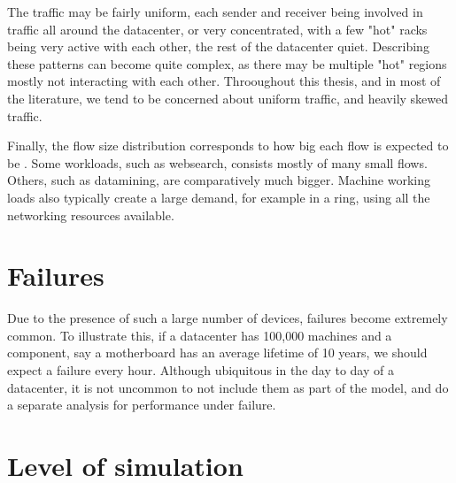 The traffic may be fairly uniform, each sender and receiver being involved in traffic all around the datacenter, or very concentrated, with a few "hot" racks being very active with each other, the rest of the datacenter quiet.
Describing these patterns can become quite complex, as there may be multiple "hot" regions mostly not interacting with each other.
Throoughout this thesis, and in most of the literature, we tend to be concerned about uniform traffic, and heavily skewed traffic. %

Finally, the flow size distribution corresponds to how big each flow is expected to be \cite{dctcp}.
Some workloads, such as websearch, consists mostly of many small flows.
Others, such as datamining, are comparatively much bigger.
Machine working loads also typically create a large demand, for example in a ring, using all the networking resources available.

\section{Failures} \label{failures} %

Due to the presence of such a large number of devices, failures become extremely common. %
To illustrate this, if a datacenter has 100,000 machines and a component, say a motherboard has an average lifetime of 10 years, we should expect a failure every hour.
Although ubiquitous in the day to day of a datacenter, it is not uncommon to not include them as part of the model, and do a separate analysis for performance under failure. %

\section{Level of simulation} \label{model-level}

